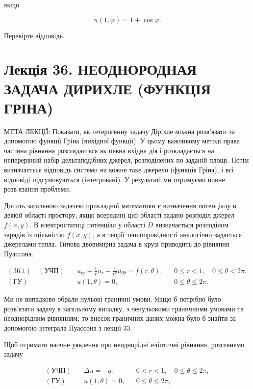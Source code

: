 \documentclass[
  ukrainian,
]{article}
\begin{document}
якщо

\[u(1,\varphi)=1+\cos\varphi.\]

Перевірте відповідь.

\section{Лекція 36. НЕОДНОРОДНАЯ ЗАДАЧА ДИРИХЛЕ (ФУНКЦІЯ
ГРІНА)}\label{ux43bux435ux43aux446ux456ux44f-36.-ux43dux435ux43eux434ux43dux43eux440ux43eux434ux43dux430ux44f-ux437ux430ux434ux430ux447ux430-ux434ux438ux440ux438ux445ux43bux435-ux444ux443ux43dux43aux446ux456ux44f-ux433ux440ux456ux43dux430}

МЕТА ЛЕКЦІЇ: Показати, як гетерогенну задачу Діріхле можна розв'язати за
допомогою функції Гріна (вихідної функції). У цьому важливому методі
права частина рівняння розглядається як певна вхідна дія і розкладається
на неперервний набір дельтаподібних джерел, розподілених по заданій
площі. Потім визначається відповідь системи на кожне таке джерело
(функція Гріна), і всі відповіді підсумовуються (інтегровані). У
результаті ми отримуємо повне розв'язання проблеми.

Досить загальною задачею прикладної математики є визначення потенціалу в
деякій області простору, якщо всередині цієї області задано розподіл
джерел \(f(x,y)\). В електростатиці потенціал у області \(D\)
визначається розподілом зарядів із щільністю \(f(x,y)\), а в теорії
теплопровідності аналогічно задається джерелами тепла. Типова двовимірна
задача в крузі приводить до рівняння Пуассона.

\[\begin{aligned}(36.1)\quad (\text{УЧП})\quad &u_{rr} + \frac{1}{r}u_r + \frac{1}{r^2}u_{\theta\theta} = f(r,\theta),&& 0 \le r < 1,\quad 0 \le \theta < 2\pi, \\(\text{ГУ})\quad &u(1,\theta)=0,&& 0 \le \theta \le 2\pi.\end{aligned}\]

Ми не випадково обрали нульові граничні умови. Якщо б потрібно було
розв'язати задачу в загальному випадку, з ненульовими граничними умовами
та неоднорідним рівнянням, то внесок граничних даних можна було б знайти
за допомогою інтеграла Пуассона з лекції 33.

Щоб отримати наочне уявлення про неоднорідні еліптичні рівняння,
розглянемо задачу

\[\begin{aligned}(\text{УЧП})\quad & \Delta u = -q, && 0 < r < 1,\quad 0 \le \theta \le 2\pi, \\(\text{ГУ})\quad & u(1,\theta)=0, && 0 \le \theta \le 2\pi,\end{aligned}\]
\end{document}
